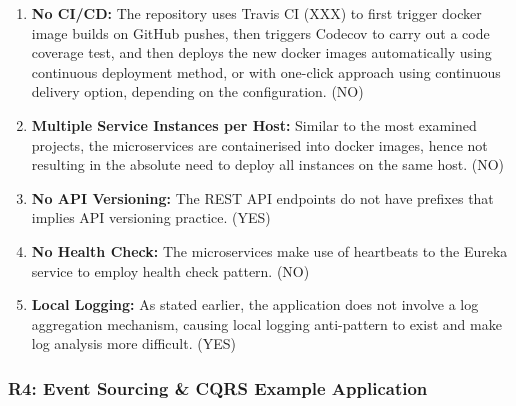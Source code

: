 \documentclass{Configuration_Files/PoliMi3i_thesis}
\begin{document}
\begin{enumerate}
    \item \textbf{No CI/CD:} The repository uses Travis CI (XXX) to first trigger docker image builds on GitHub pushes, then triggers Codecov to carry out a code coverage test, and then deploys the new docker images automatically using continuous deployment method, or with one-click approach using continuous delivery option, depending on the configuration. (NO)
    
    \item \textbf{Multiple Service Instances per Host:} Similar to the most examined projects, the microservices are containerised into docker images, hence not resulting in the absolute need to deploy all instances on the same host. (NO)
    
    \item \textbf{No API Versioning:} The REST API endpoints do not have prefixes that implies API versioning practice. (YES)
    
    \item \textbf{No Health Check:} The microservices make use of heartbeats to the Eureka service to employ health check pattern. (NO)
    
    \item \textbf{Local Logging:} As stated earlier, the application does not involve a log aggregation mechanism, causing local logging anti-pattern to exist and make log analysis more difficult. (YES)
\end{enumerate}

\subsubsection{R4: Event Sourcing \& CQRS Example Application}
\label{subsubsec:R4}
\end{document}
